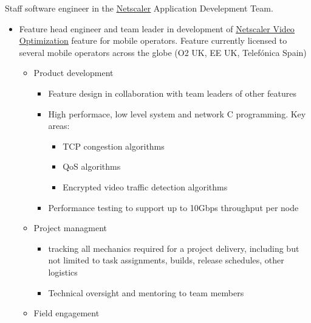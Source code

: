 \documentclass[10pt,a4paper]{moderncv}        %
\newcommand{\fancyhref}[1]{\color{blue}\underline{#1}}
\begin{document}
{Staff software engineer in the \href{https://www.citrix.com/products/citrix-adc/}{\fancyhref{Netscaler}} Application Develepment Team.
\begin{itemize}
  \item Feature head engineer and team leader in development of 
  \href{https://docs.citrix.com/en-us/netscaler/12/netscaler-support-for-telecom-service-providers/NetScaler-Video-Optimization/Getting-Started.html}{\fancyhref{Netscaler Video Optimization}} feature for mobile operators.
  Feature currently licensed to several mobile operators across the globe (O2 UK, EE UK, Telefónica Spain)
  \begin{itemize}
    \item Product development
    \begin{itemize}
      \item Feature design in collaboration with team leaders of other features
      \item High performace, low level system and network C programming. Key areas:
      \begin{itemize}
        \item TCP congestion algorithms
        \item QoS algorithms
        \item Encrypted video traffic detection algorithms
      \end{itemize}
      \item Performance testing to support up to 10Gbps throughput per node
    \end{itemize}
    \item Project managment
    \begin{itemize}
      \item tracking all mechanics required for a project delivery, including but not limited to task assignments, builds, release schedules, other logistics 
      \item Technical oversight and mentoring to team members
    \end{itemize}
    \item Field engagement
    \begin{itemize}

\end{itemize}
\end{itemize}
\end{itemize}}
\end{document}
